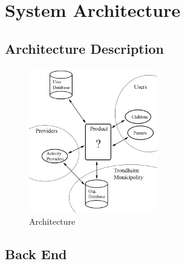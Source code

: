
\chapter{System Architecture}

\section{Architecture Description}
 
\begin{figure}[h!]
\centering
    \includegraphics[width=0.5\textwidth]{fig/arkitektur}
\caption{Architecture}
\end{figure}


\section{Back End}

